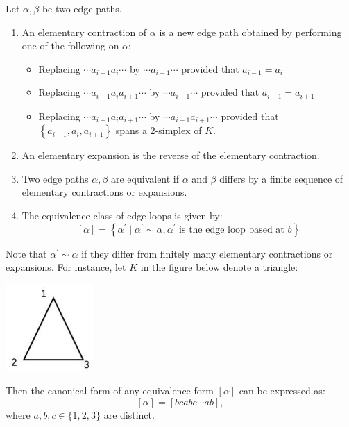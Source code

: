 \begin{definition}  Let \(\alpha,\beta\) be two edge paths.

 \begin{enumerate}
     \item An elementary contraction of \(\alpha\) is a new edge path obtained by performing one of the following on \(\alpha\):

\begin{itemize}
\item Replacing \(\cdots {a}_{i - 1}{a}_{i}\cdots\) by \(\cdots {a}_{i - 1}\cdots\) provided that \({a}_{i - 1} = {a}_{i}\)

\item Replacing \(\cdots {a}_{i - 1}{a}_{i}{a}_{i + 1}\cdots\) by \(\cdots {a}_{i - 1}\cdots\) provided that \({a}_{i - 1} = {a}_{i + 1}\)

\item Replacing \(\cdots {a}_{i - 1}{a}_{i}{a}_{i + 1}\cdots\) by \(\cdots {a}_{i - 1}{a}_{i + 1}\cdots\) provided that \(\left\{  {{a}_{i - 1},{a}_{i},{a}_{i + 1}}\right\}\) spans a 2-simplex of \(K\).
\end{itemize}

\item An elementary expansion is the reverse of the elementary contraction.

\item Two edge paths \(\alpha,\beta\) are equivalent if \(\alpha\) and \(\beta\) differs by a finite sequence of elementary contractions or expansions.

\item The equivalence class of edge loops is given by:
\[
\left\lbrack  \alpha \right\rbrack   = \left\{  {{\alpha }^{\prime } \mid  {\alpha }^{\prime } \sim  \alpha,{\alpha }^{\prime }\text{ is the edge loop based at }b}\right\}
\]
\end{enumerate}
\end{definition}

Note that \({\alpha }^{\prime } \sim  \alpha\) if they differ from finitely many elementary contractions or expansions. For instance, let \(K\) in the figure below denote a triangle:
\begin{center}
\includegraphics[width=0.25\textwidth]{images/Ch8_triangle123.jpg}
\end{center}
Then the canonical form of any equivalence form \(\left\lbrack  \alpha \right\rbrack\) can be expressed as:
\[
\left\lbrack  \alpha \right\rbrack   = \left\lbrack  {{bcabc}\cdots {ab}}\right\rbrack ,
\]
where \(a,b,c \in  \{ 1,2,3\}\) are distinct.

